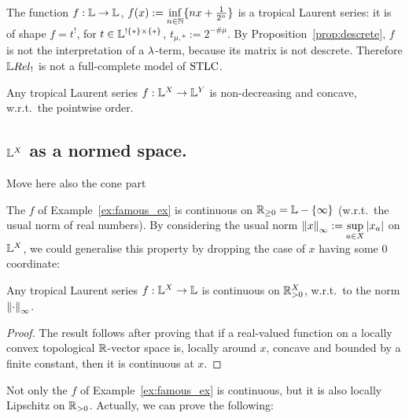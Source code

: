 \begin{example}\label{ex:famous_ex}
 The function $f:\mathbb{L}\to\mathbb{L}$, $f(x):=\inf\limits_{n\in\mathbb{N}}\{nx+\frac{1}{2^n}\}$ is a tropical Laurent series: it is of shape $f=t^!$, for $t\in\mathbb{L}^{!\{*\}\times\{*\}}$, $t_{\mu,*}:=2^{-\# \mu}$.
By Proposition~\ref{prop:descrete}, $f$ is not the interpretation of a $\lambda$-term, because its matrix is not descrete. Therefore $\LREL_!$ is not a full-complete model of $\mathrm{STLC}$.
\end{example}

\begin{proposition}\label{prop:nondecr+conc}
 Any tropical Laurent series $f:\mathbb{L}^X\to\mathbb{L}^Y$ is non-decreasing and concave, w.r.t.\ the pointwise order.
\end{proposition}

\subsection{$\mathbb{L}^{X}$ as a normed space.}

{\color{red}Move here also the cone part}

The $f$ of Example~\ref{ex:famous_ex} is continuous on $\mathbb{R}_{\geq0}=\mathbb{L}-\{\infty\}$ (w.r.t.\ the usual norm of real numbers).
By considering the usual norm $\left\lVert x\right\rVert_\infty:=\sup\limits_{a\in X} \left\lvert x_a\right\rvert$ on $\mathbb{L}^X$, we could generalise this property by dropping the case of $x$ having some $0$ coordinate:

\begin{theorem}\label{thm:cont}
 Any tropical Laurent series $f:\mathbb{L}^X\to\mathbb{L}$ is continuous on $\mathbb{R}_{>0}^X$, w.r.t.\ to the norm $\left\lVert\cdot\right\rVert_\infty$.
\end{theorem}
\begin{proof}
 The result follows after proving that if a real-valued function on a locally convex topological $\mathbb{R}$-vector space is, locally around $x$, concave and bounded by a finite constant, then it is continuous at $x$.
\end{proof}

Not only the $f$ of Example~\ref{ex:famous_ex} is continuous, but it is also locally Lipschitz on $\mathbb{R}_{>0}$.
Actually, we can prove the following:

